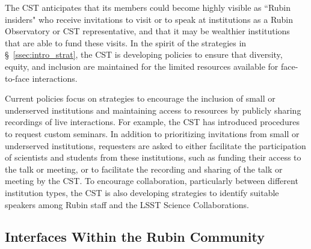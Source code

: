 \documentclass[DM,authoryear,toc]{lsstdoc}
\begin{document}
The CST anticipates that its members could become highly visible as ``Rubin insiders" who receive invitations to visit or to speak at institutions as a Rubin Observatory or CST representative, and that it may be wealthier institutions that are able to fund these visits.
In the spirit of the strategies in \S~\ref{ssec:intro_strat}, the CST is developing policies to ensure that diversity, equity, and inclusion are maintained for the limited resources available for face-to-face interactions. 

Current policies focus on strategies to encourage the inclusion of small or underserved institutions and maintaining access to resources by publicly sharing recordings of live interactions. 
For example, the CST has introduced procedures to request custom seminars. In addition to prioritizing invitations from small or underserved institutions, requesters are asked to either facilitate the participation of scientists and students from these institutions, such as funding their access to the talk or meeting, or to facilitate the recording and sharing of the talk or meeting by the CST. 
To encourage collaboration, particularly between different institution types, the CST is also developing strategies to identify suitable speakers among Rubin staff and the LSST Science Collaborations.

\subsection{Interfaces Within the Rubin Community}\label{ssec:mod_interface}
\end{document}
